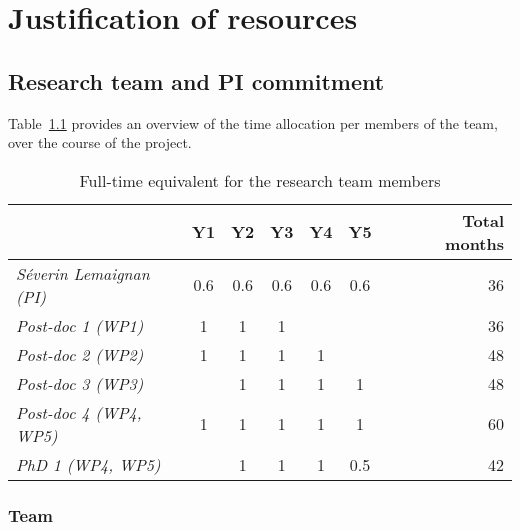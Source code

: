 \chapter{Justification of resources}


\section{Research team and PI commitment}

Table~\ref{time-allocation-team} provides an overview of the time allocation per
members of the team, over the course of the project.

\begin{table}[h!]
    \centering
\begin{tabular}{@{}lccccccr@{}}
\toprule
\textit{\textbf{}}              & \textbf{Y1} & \textbf{Y2} & \textbf{Y3} & \textbf{Y4} & \textbf{Y5} &  & \textbf{Total months} \\ \midrule
\textit{Séverin Lemaignan (PI)} & 0.6         & 0.6         & 0.6         & 0.6    & 0.6         &  & 36                    \\ \midrule
\textit{Post-doc 1 (WP1)}       & 1           & 1           & 1           &             &             &  & 36                    \\
\textit{Post-doc 2 (WP2)}       & 1           & 1           & 1           & 1           &             &  & 48                    \\
\textit{Post-doc 3 (WP3)}       &             & 1           & 1           & 1           & 1           &  & 48                    \\
\textit{Post-doc 4 (WP4, WP5)}  & 1           & 1           & 1           & 1           & 1           &  & 60                    \\
\textit{PhD 1 (WP4, WP5)}       &             & 1           & 1           & 1           & 0.5         &  & 42                    \\ \bottomrule
\end{tabular}
    \caption{Full-time equivalent for the research team members}
    \label{time-allocation-team}
\end{table}




\subsection{Team}

